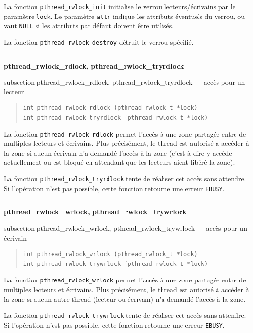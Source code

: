 \documentclass [twoside] {report}
\newcommand {\primitive} [1]
    {
	\phantomsection
	{\large \textbf {#1}}
	\addcontentsline {toc} {subsection} {#1}
    }
\newcommand {\separation}
    {
	\vspace {5mm}
	\nopagebreak
	\hrule
    }
\begin{document}
La fonction \verb|pthread_rwlock_init| initialise le verrou
lecteurs/écrivains par le paramètre \texttt {lock}.  Le paramètre
\texttt {attr} indique les attributs éventuels du verrou, ou vaut
\texttt {NULL} si les attributs par défaut doivent être utilisés.

La fonction \verb|pthread_rwlock_destroy| détruit le verrou spécifié.


\separation
\primitive {pthread\_rwlock\_rdlock, pthread\_rwlock\_tryrdlock} --- accès pour un lecteur

\begin {quote}
\begin {verbatim}
int pthread_rwlock_rdlock (pthread_rwlock_t *lock)
int pthread_rwlock_tryrdlock (pthread_rwlock_t *lock)
\end{verbatim}
\end {quote}

La fonction \verb|pthread_rwlock_rdlock| permet l'accès à une zone
partagée entre de multiples lecteurs et écrivains. Plus précisément,
le thread est autorisé à accéder à la zone si aucun écrivain n'a
demandé l'accès à la zone (c'est-à-dire y accède actuellement ou
est bloqué en attendant que les lecteurs aient libéré la zone).

La fonction \verb|pthread_rwlock_tryrdlock| tente de réaliser cet accès
sans attendre. Si l'opération n'est pas possible, cette fonction retourne
une erreur \texttt {EBUSY}.


\separation
\primitive {pthread\_rwlock\_wrlock, pthread\_rwlock\_trywrlock} --- accès pour un écrivain

\begin {quote}
\begin {verbatim}
int pthread_rwlock_wrlock (pthread_rwlock_t *lock)
int pthread_rwlock_trywrlock (pthread_rwlock_t *lock)
\end{verbatim}
\end {quote}

La fonction \verb|pthread_rwlock_wrlock| permet l'accès à une zone
partagée entre de multiples lecteurs et écrivains. Plus précisément,
le thread est autorisé à accéder à la zone si aucun autre thread
(lecteur ou écrivain) n'a demandé l'accès à la zone.

La fonction \verb|pthread_rwlock_trywrlock| tente de réaliser cet
accès sans attendre.  Si l'opération n'est pas possible, cette fonction
retourne une erreur \texttt {EBUSY}.
\end{document}
